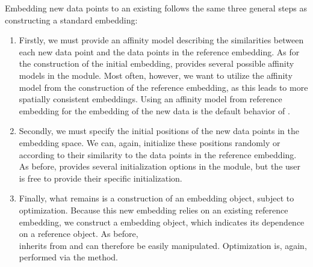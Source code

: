 \documentclass[article]{jss}
\newcommand{\opentsne}{\pkg{openTSNE}\xspace}
\begin{document}
Embedding new data points to an existing 
follows the same three general steps as constructing a standard embedding:
\begin{enumerate}
\item Firstly, we must provide an affinity model describing the similarities between each new data point and the data points in the reference embedding. As for the construction of the initial embedding, \opentsne provides several possible affinity models in the  module. Most often, however, we want to utilize the affinity model from the construction of the reference embedding, as this leads to more spatially consistent embeddings. Using an affinity model from reference embedding for the embedding of the new data is the default behavior of \opentsne.


\item Secondly, we must specify the initial positions of the new data points in the embedding space. We can, again, initialize these positions randomly or according to their similarity to the data points in the reference embedding. As before, \opentsne provides several initialization options in the  module, but the user is free to provide their specific initialization.

\item Finally, what remains is a construction of an embedding object, subject to optimization. Because this new embedding relies on an existing reference embedding, we construct a  embedding object, which indicates its dependence on a reference  object. As before, \\
 inherits from  and can therefore be easily manipulated. Optimization is, again, performed via the  method.
\end{enumerate}
\end{document}
